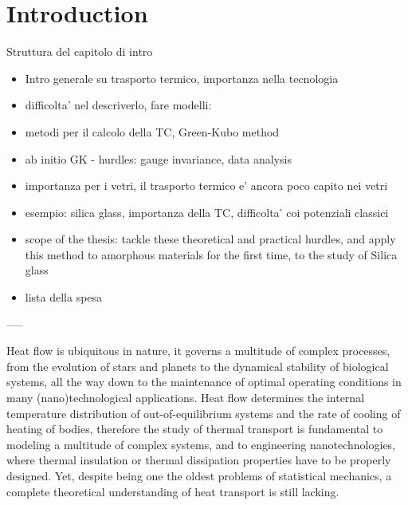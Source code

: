 \chapter{Introduction}

\begin{LEtext}
Struttura del capitolo di intro
\begin{itemize}
    \item Intro generale su trasporto termico, importanza nella tecnologia
    \item difficolta' nel descriverlo, fare modelli: 
    \item metodi per il calcolo della TC, Green-Kubo method
    \item ab initio GK - hurdles: gauge invariance, data analysis
    \item importanza per i vetri, il trasporto termico e' ancora poco capito nei vetri
    \item esempio: silica glass, importanza della TC, difficolta' coi potenziali classici
    \item scope of the thesis: tackle these theoretical and practical hurdles, and apply this method to amorphous materials for the first time, to the study of Silica glass
    \item lista della spesa
\end{itemize}
-----
\end{LEtext}
\bigskip

Heat flow is ubiquitous in nature, it governs a multitude of complex processes, from the evolution of stars and planets to the dynamical stability of biological systems, all the way down to the maintenance of optimal operating conditions in many (nano)technological applications. 
Heat flow determines the internal temperature distribution of out-of-equilibrium systems and the rate of cooling of heating of bodies, therefore the study of thermal transport is fundamental to modeling a multitude of complex systems, and to engineering nanotechnologies, where thermal insulation or thermal dissipation properties have to be properly designed. 
Yet, despite being one the oldest problems of statistical mechanics, a complete theoretical understanding of heat transport is still lacking. 

